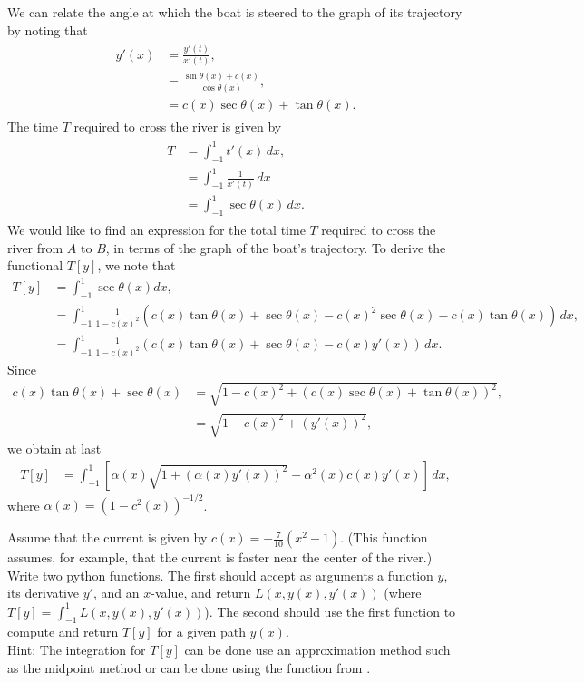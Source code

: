 We can relate the angle at which the boat is steered to the graph of its trajectory by noting that 
\begin{align}
\begin{split}
	y'(x) &= \frac{y'(t)}{x'(t)} ,\\
	&= \frac{\sin \theta(x) + c(x)}{\cos \theta(x)},\\
	&= c(x)\sec \theta(x) + \tan \theta(x) .%
\end{split} \label{rivercrossing:angle}
\end{align}
The time $T$ required to cross the river is given by
\begin{align}
\begin{split}
	T &= \int_{-1}^1 t'(x)\, dx, \\
	&= \int_{-1}^1 \frac{1}{x'(t)}\, dx \\ 
	&= \int_{-1}^1 \sec \theta(x)\, dx. 
\end{split}\label{rivercrossing:T}
\end{align}
We would like to find an expression for the total time $T$ required to cross the river from $A$ to $B$, in terms of the graph of the boat's trajectory. 
To derive the functional $T[y]$, we note that 
\begin{align*}
	T[y] &= \int_{-1}^1 \sec \theta(x) dx,\\
	&= \int_{-1}^1 \frac{1}{1-c(x)^2}(c(x) \tan \theta(x) + \sec \theta(x) -c(x)^2 \sec \theta(x) - c(x)\tan \theta(x))\, dx, \\
	&= \int_{-1}^1 \frac{1}{1-c(x)^2}(c(x) \tan \theta(x) + \sec \theta(x) -c(x) y'(x) )\, dx.	
\end{align*}
Since 
\begin{align*}
	c(x)\tan \theta(x) + \sec \theta(x) &= \sqrt{1 - c(x)^2 + (c(x) \sec \theta(x) + \tan \theta(x))^2},\\
	&= \sqrt{1 - c(x)^2 + (y'(x))^2},
\end{align*}
we obtain at last
\begin{align}
	T[y] &= \int_{-1}^1 \left[ \alpha(x)\sqrt{1 + (\alpha(x) y'(x))^2} - \alpha^2(x) c(x) y'(x) \right]\, dx,
\end{align}
where $\alpha(x) = (1 - c^2(x))^{-1/2}$.

\begin{problem}
Assume that the current is given by $c(x) = -\frac{7}{10}(x^2-1)$. (This function assumes, for example, that the current is faster near the center of the river.)
Write two python functions. The first should accept as arguments a function $y$, its derivative $y'$, and an $x$-value, and return $L(x,y(x),y'(x))$ (where $T[y] = \int_{-1}^1 L(x,y(x),y'(x))$). 
The second should use the first function to compute and return $T[y]$ for a given path $y(x)$.
\\ Hint: The integration for $T[y]$ can be done use an approximation method such as the midpoint method or can be done using the  function from .
\end{problem}

